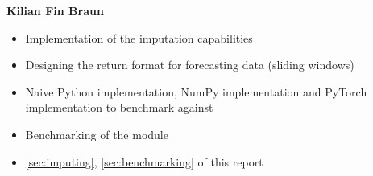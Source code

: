 \documentclass[review]{AIM_report}
\begin{document}
\textbf{Kilian Fin Braun}
\begin{itemize}
    \item Implementation of the imputation capabilities
    \item Designing the return format for forecasting data (sliding windows)
    \item Naive Python implementation, NumPy implementation and PyTorch implementation to benchmark against
    \item Benchmarking of the module
    \item \autoref{sec:imputing}, \autoref{sec:benchmarking} of this report
\end{itemize}


\newpage

\printbibliography
\newpage

\pagestyle{empty}



\newpage
\pagestyle{empty}



\newpage
\pagestyle{empty}


\end{document}
